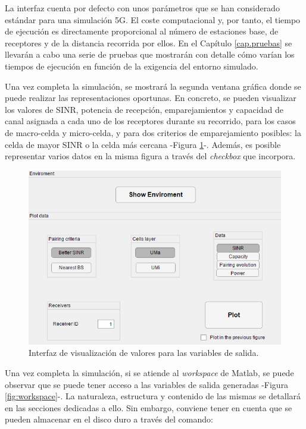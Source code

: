 La interfaz cuenta por defecto con unos parámetros que se han considerado estándar para una simulación 5G. El coste computacional y, por tanto, el tiempo de ejecución es directamente proporcional al número de estaciones base, de receptores y de la distancia recorrida por ellos. En el Capítulo \ref{cap.pruebas} se llevarán a cabo una serie de pruebas que mostrarán con detalle cómo varían los tiempos de ejecución en función de la exigencia del entorno simulado.

Una vez completa la simulación, se mostrará la segunda ventana gráfica donde se puede realizar las representaciones oportunas. En concreto, se pueden visualizar los valores de SINR, potencia de recepción, emparejamientos y capacidad de canal asignada a cada uno de los receptores durante su recorrido, para los casos de macro-celda y micro-celda, y para dos criterios de emparejamiento posibles: la celda de mayor SINR o la celda más cercana -Figura \ref{fig:interfaz_visualizacion}-. Además, es posible representar varios datos en la misma figura a través del \textit{checkbox} que incorpora.

\begin{figure}[h!]
	\centering
    \includegraphics[width=\linewidth]{imagenes/interfaz_visualizacion.PNG}
	\caption{Interfaz de visualización de valores para las variables de salida.}
	\label{fig:interfaz_visualizacion}
\end{figure}

Una vez completa la simulación, si se atiende al \textit{workspace} de Matlab, se puede observar que se puede tener acceso a las variables de salida generadas -Figura \ref{fig:workspace}-. La naturaleza, estructura y contenido de las mismas se detallará en las secciones dedicadas a ello. Sin embargo, conviene tener en cuenta que se pueden almacenar en el disco duro a través del comando:

